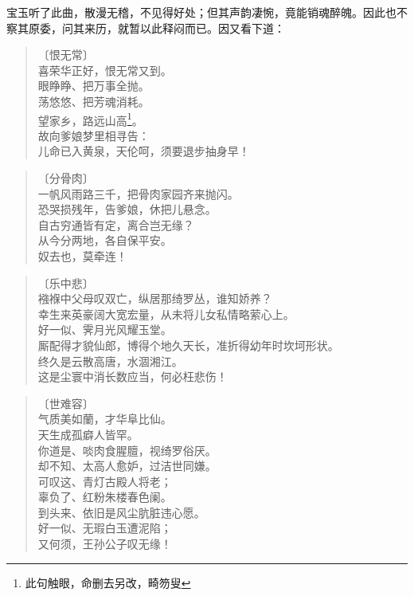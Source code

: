\documentclass[12pt,oneside]{book}
\newenvironment{shici}{%
\begin{verse}%
\centering\large\hspace{12pt}}%
{\end{verse}}
\begin{document}
宝玉听了此曲，散漫无稽，不见得好处；但其声韵凄惋，竟能销魂醉魄。因此也不察其原委，问其来历，就暂以此释闷而已。因又看下道：

\begin{shici}
〔恨无常〕\\
喜荣华正好，恨无常又到。\\
眼睁睁、把万事全抛。\\
荡悠悠、把芳魂消耗。\\
望家乡，路远山高\footnote{此句触眼，命删去另改，畸笏叟}。\\
故向爹娘梦里相寻告：\\
儿命已入黄泉，天伦呵，须要退步抽身早！
\end{shici}

\begin{shici}
〔分骨肉〕\\
一帆风雨路三千，把骨肉家园齐来抛闪。\\
恐哭损残年，告爹娘，休把儿悬念。\\
自古穷通皆有定，离合岂无缘？\\
从今分两地，各自保平安。\\
奴去也，莫牵连！
\end{shici}


\begin{shici}
〔乐中悲〕\\
襁褓中父母叹双亡，纵居那绮罗丛，谁知娇养？\\
幸生来英豪阔大宽宏量，从未将儿女私情略萦心上。\\
好一似、霁月光风耀玉堂。\\
厮配得才貌仙郎，博得个地久天长，准折得幼年时坎坷形状。\\
终久是云散高唐，水涸湘江。\\
这是尘寰中消长数应当，何必枉悲伤！
\end{shici}

\begin{shici}
〔世难容〕\\
气质美如蘭，才华阜比仙。\\
天生成孤癖人皆罕。\\
你道是、啖肉食腥膻，视绮罗俗厌。\\
却不知、太高人愈妒，过洁世同嫌。\\
可叹这、青灯古殿人将老；\\
辜负了、红粉朱楼春色阑。\\
到头来、依旧是风尘肮脏违心愿。\\
好一似、无瑕白玉遭泥陷；\\
又何须，王孙公子叹无缘！
\end{shici}
\end{document}
